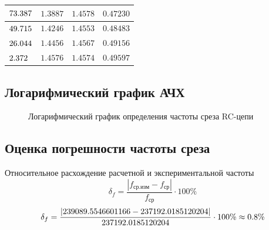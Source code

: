 \documentclass[12pt,a4paper]{article}
\newcommand{\CalcTwo}  [1]{\fpeval{round((#1),2)}}
\newcommand{\CalcThree}[1]{\fpeval{round((#1),3)}}
\def\ProblemThreeResistance{456.46}
\def\ProblemFourCapacitance{0.00000000147}
\edef\FCutCalc{\fpeval{1/(2*pi*\ProblemThreeResistance*\ProblemFourCapacitance)}}
\edef\FCutExp{\fpeval{\FCutCalc*1.008}}
\edef\FLow{\fpeval{0.01*\FCutCalc}}
\edef\FCutCalcKHz{\fpeval{\FCutCalc*10^(-3)}}
\edef\FCutExpKHz{\fpeval{\FCutExp*10^(-3)}}
\edef\FLowKHz{\fpeval{\FLow*10^(-3)}}
\edef\FTableSixOne{\fpeval{\FCutExpKHz}}
\edef\FTableSixTwo{\fpeval{\FCutExpKHz - (\FCutExpKHz-\FLowKHz)/10}}
\edef\FTableSixThree{\fpeval{\FCutExpKHz - 2*(\FCutExpKHz-\FLowKHz)/10}}
\edef\FTableSixFour{\fpeval{\FCutExpKHz - 3*(\FCutExpKHz-\FLowKHz)/10}}
\edef\FTableSixFive{\fpeval{\FCutExpKHz - 4*(\FCutExpKHz-\FLowKHz)/10}}
\edef\FTableSixSix{\fpeval{\FCutExpKHz - 5*(\FCutExpKHz-\FLowKHz)/10}}
\edef\FTableSixSeven{\fpeval{\FCutExpKHz - 6*(\FCutExpKHz-\FLowKHz)/10}}
\edef\FTableSixEight{\fpeval{\FCutExpKHz - 7*(\FCutExpKHz-\FLowKHz)/10}}
\edef\FTableSixNine{\fpeval{\FCutExpKHz - 8*(\FCutExpKHz-\FLowKHz)/10}}
\edef\FTableSixTen{\fpeval{\FCutExpKHz - 9*(\FCutExpKHz-\FLowKHz)/10}}
\edef\FTableSixEleven{\fpeval{\FLowKHz}}
\def\ProblemFourCutVoutOne{1.0260}
\def\ProblemFourCutVoutTwo{1.0770}
\def\ProblemFourCutVoutThree{1.1326}
\def\ProblemFourCutVoutFour{1.1867}
\def\ProblemFourCutVoutFive{1.2423}
\def\ProblemFourCutVoutSix{1.2936}
\def\ProblemFourCutVoutSeven{1.3462}
\def\ProblemFourCutVoutEight{1.3887}
\def\ProblemFourCutVinEight{1.4578}
\def\ProblemFourCutVRMSTwoEight{0.47230}
\def\ProblemFourCutVoutNine{1.4246}
\def\ProblemFourCutVinNine{1.4553}
\def\ProblemFourCutVRMSTwoNine{0.48483}
\def\ProblemFourCutVoutTen{1.4456}
\def\ProblemFourCutVinTen{1.4567}
\def\ProblemFourCutVRMSTwoTen{0.49156}
\def\ProblemFourCutVoutEleven{1.4576}
\def\ProblemFourCutVinEleven{1.4574}
\def\ProblemFourCutVRMSTwoEleven{0.49597}
\begin{document}
\begin{table}[H]
\begin{tabularx}{\textwidth}{|p{4.2cm}|C|C|C|}
\hline
$\CalcThree{\FTableSixEight}$ & $\ProblemFourCutVoutEight$ & $\ProblemFourCutVinEight$ & $\ProblemFourCutVRMSTwoEight$ \\
\hline
$\CalcThree{\FTableSixNine}$ & $\ProblemFourCutVoutNine$ & $\ProblemFourCutVinNine$ & $\ProblemFourCutVRMSTwoNine$ \\
\hline
$\CalcThree{\FTableSixTen}$ & $\ProblemFourCutVoutTen$ & $\ProblemFourCutVinTen$ & $\ProblemFourCutVRMSTwoTen$ \\
\hline
$\CalcThree{\FTableSixEleven}$ & $\ProblemFourCutVoutEleven$ & $\ProblemFourCutVinEleven$ & $\ProblemFourCutVRMSTwoEleven$ \\
\hline
\end{tabularx}
\end{table}

\subsection{Логарифмический график АЧХ}

\begin{figure}[H]
\centering
{}
\caption{Логарифмический график определения частоты среза RC-цепи}
\label{fig:ach-cutoff}
\end{figure}

\subsection{Оценка погрешности частоты среза}

Относительное расхождение расчетной и экспериментальной частоты
\begin{equation*}
\delta_f=\frac{|f_{\text{ср.изм}}-f_{\text{ср}}|}{f_{\text{ср}}}\cdot100\%
\end{equation*}
\begin{equation}
\delta_f=\frac{|\FCutExp-\FCutCalc|}{\FCutCalc}\cdot100\%\approx\CalcTwo{abs(\FCutExp-\FCutCalc)/\FCutCalc*100}\%
\label{eq:fcut-diff}
\end{equation}
\end{document}
